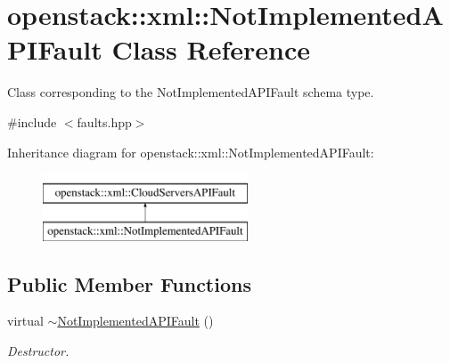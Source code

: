 \hypertarget{classopenstack_1_1xml_1_1NotImplementedAPIFault}{
\section{openstack::xml::NotImplementedAPIFault Class Reference}
\label{classopenstack_1_1xml_1_1NotImplementedAPIFault}
}


Class corresponding to the NotImplementedAPIFault schema type.  




{\ttfamily \#include $<$faults.hpp$>$}

Inheritance diagram for openstack::xml::NotImplementedAPIFault:\begin{figure}[H]
\begin{center}
\leavevmode
\includegraphics[height=2.000000cm]{classopenstack_1_1xml_1_1NotImplementedAPIFault}
\end{center}
\end{figure}
\subsection*{Public Member Functions}
\begin{DoxyCompactItemize}
\item 
\hypertarget{classopenstack_1_1xml_1_1NotImplementedAPIFault_ab2daf0e3c51627465713d874ec51d694}{
virtual \hyperlink{classopenstack_1_1xml_1_1NotImplementedAPIFault_ab2daf0e3c51627465713d874ec51d694}{$\sim$NotImplementedAPIFault} ()}
\label{classopenstack_1_1xml_1_1NotImplementedAPIFault_ab2daf0e3c51627465713d874ec51d694}

\begin{DoxyCompactList}\small\item\em Destructor. \item\end{DoxyCompactList}\end{DoxyCompactItemize}
